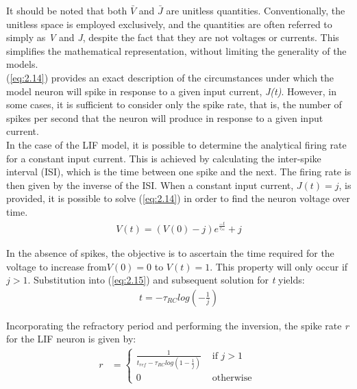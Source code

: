 \noindent It should be noted that both $\bar{V}$ and $\bar{J}$ are unitless quantities. Conventionally, the unitless space is employed exclusively, and the quantities are often referred to simply as \textit{V} and \textit{J}, despite the fact that they are not voltages or currents. This simplifies the mathematical representation, without limiting the generality of the models. \\

\noindent (\ref{eq:2.14}) provides an exact description of the circumstances under which the model neuron will spike in response to a given input current, \textit{J(t)}. However, in some cases, it is sufficient to consider only the spike rate, that is, the number of spikes per second that the neuron will produce in response to a given input current. \\

\noindent In the case of the LIF model, it is possible to determine the analytical firing rate for a constant input current. This is achieved by calculating the inter-spike interval (ISI), which is the time between one spike and the next. The firing rate is then given by the inverse of the ISI. When a constant input current, $J(t) = j$, is provided, it is possible to solve (\ref{eq:2.14}) in order to find the neuron voltage over time. 
\begin{align}
    V(t) = (V(0) - j)e^{\frac{-t}{\tau_{rc}}} + j \label{eq:2.15}
\end{align}

\noindent In the absence of spikes, the objective is to ascertain the time required for the voltage to increase from$ V(0) = 0$ to $V(t) = 1$. This property will only occur if $j > 1$. Substitution into (\ref{eq:2.15}) and subsequent solution for \textit{t} yields:
\begin{align}
    t = - \tau_{RC} log \left( - \frac{1}{j} \right) \label{eq:2.16}
\end{align}

\noindent Incorporating the refractory period and performing the inversion, the spike rate \textit{r} for the LIF neuron is given by:
\begin{align}
    r &= \begin{cases}
    \frac{1}{t_{ref} - \tau_{RC} log \left( 1 - \frac{1}{j} \right)} & \text{ if } j > 1 \\ 
    0 & \text{ otherwise }  
    \end{cases} \label{eq:2.17}
\end{align}



